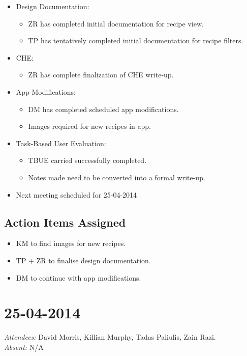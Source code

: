 \documentclass{article}
\begin{document}
\begin{itemize}
\item Design Documentation:
  \begin{itemize}
  \item ZR has completed initial documentation for recipe view.
  \item TP has tentatively completed initial documentation for recipe filters.
  \end{itemize}
\item CHE:
  \begin{itemize}
  \item ZR has complete finalization of CHE write-up.
  \end{itemize}
\item App Modifications:
  \begin{itemize}
  \item DM has completed scheduled app modifications.
  \item Images required for new recipes in app.
  \end{itemize}
\item Task-Based User Evaluation:
  \begin{itemize}
  \item TBUE carried successfully completed.
  \item Notes made need to be converted into a formal write-up.
  \end{itemize}
\item Next meeting scheduled for 25-04-2014
\end{itemize}

\subsection*{Action Items Assigned}
\begin{itemize}
\item KM to find images for new recipes.
\item TP + ZR to finalise design documentation.
\item DM to continue with app modifications.
\end{itemize}


\clearpage

\section*{25-04-2014}
\vspace{0.5cm}
\emph{Attendees: }David Morris, Killian Murphy, Tadas Paliulis, Zain Razi.
\\
\emph{Absent: }N/A
\end{document}
